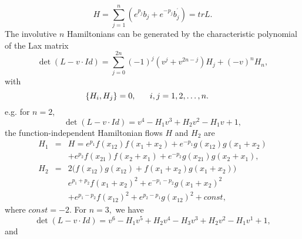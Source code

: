 \documentclass[a4paper,12pt]{article}
\begin{document}
\begin{equation}
H=\sum_{j=1}^{n}(e^{p_{j}}b_{j}+e^{-p_{j}}b_{j}^{^{\prime }})=trL.
\end{equation}
The involutive $n$ Hamiltonians can be generated by the characteristic
polynomial of the Lax matrix
\begin{equation}
\det (L-v\cdot
Id)=\sum_{j=0}^{2n}(-1)^{j}(v^{j}+v^{2n-j})H_{j}+(-v)^{n}H_{n},
\end{equation}
with
\begin{equation}
\{H_{i},H_{j}\}=0,\mbox{$ \ \ \ \ \ $}i,j=1,2,\ldots ,n.\mbox{$\ \ \ \ $}
\end{equation}
e.g. for $n=2$,
\begin{equation}
\det (L-v\cdot Id)=v^{4}-H_{1}v^{3}+H_{2}v^{2}-H_{1}v+1,
\end{equation}
the function-independent Hamiltonian flows $H$ and $H_{2}$ are
\begin{eqnarray}
H_{1} &=&H=e^{p_{1}}f(x_{12})f(x_{1}+x_{2})+e^{-p_{1}}g(x_{12})g(x_{1}+x_{2})
\nonumber \\
&&+e^{p_{2}}f(x_{21})f(x_{2}+x_{1})+e^{-p_{2}}g(x_{21})g(x_{2}+x_{1}), \\
H_{2} &=&2\Big(f(x_{12})g(x_{12})+f(x_{1}+x_{2})g(x_{1}+x_{2})\Big)
\nonumber \\
&&e^{p_{1}+p_{2}}f(x_{1}+x_{2})^{2}+e^{-p_{1}-p_{2}}g(x_{1}+x_{2})^{2}
\nonumber \\
&&+e^{p_{1}-p_{2}}f(x_{12})^{2}+e^{p_{2}-p_{1}}g(x_{12})^{2}+const,
\end{eqnarray}
where $const=-2$. For $n=3,$ we have
\begin{equation}
\det (L-v\cdot
Id)=v^{6}-H_{1}v^{5}+H_{2}v^{4}-H_{3}v^{3}+H_{2}v^{2}-H_{1}v^{1}+1,
\end{equation}
and
\end{document}
